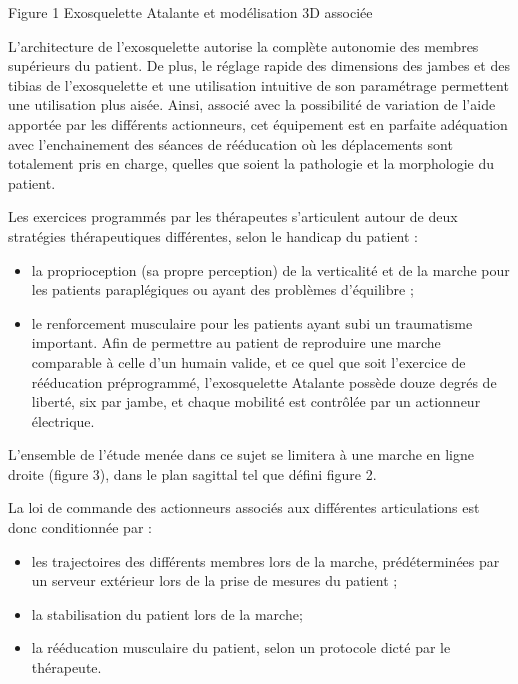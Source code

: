 \documentclass[10pt]{article}
\begin{document}
Figure 1 Exosquelette Atalante et modélisation 3D associée

L'architecture de l'exosquelette autorise la complète autonomie des membres supérieurs du patient. De plus, le réglage rapide des dimensions des jambes et des tibias de l'exosquelette et une utilisation intuitive de son paramétrage permettent une utilisation plus aisée. Ainsi, associé avec la possibilité de variation de l'aide apportée par les différents actionneurs, cet équipement est en parfaite adéquation avec l'enchainement des séances de rééducation où les déplacements sont totalement pris en charge, quelles que soient la pathologie et la morphologie du patient.

Les exercices programmés par les thérapeutes s'articulent autour de deux stratégies thérapeutiques différentes, selon le handicap du patient :

\begin{itemize}
  \item la proprioception (sa propre perception) de la verticalité et de la marche pour les patients paraplégiques ou ayant des problèmes d'équilibre ;

  \item le renforcement musculaire pour les patients ayant subi un traumatisme important. Afin de permettre au patient de reproduire une marche comparable à celle d'un humain valide, et ce quel que soit l'exercice de rééducation préprogrammé, l'exosquelette Atalante possède douze degrés de liberté, six par jambe, et chaque mobilité est contrôlée par un actionneur électrique.

\end{itemize}

L'ensemble de l'étude menée dans ce sujet se limitera à une marche en ligne droite (figure 3), dans le plan sagittal tel que défini figure 2.

La loi de commande des actionneurs associés aux différentes articulations est donc conditionnée par :

\begin{itemize}
  \item les trajectoires des différents membres lors de la marche, prédéterminées par un serveur extérieur lors de la prise de mesures du patient ;

  \item la stabilisation du patient lors de la marche;

  \item la rééducation musculaire du patient, selon un protocole dicté par le thérapeute.

\end{itemize}
\end{document}
